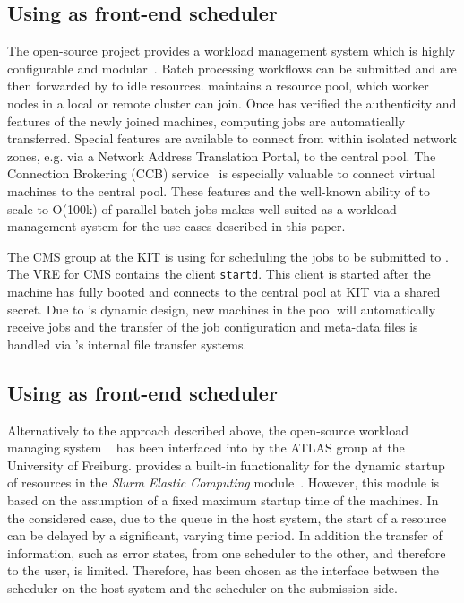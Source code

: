\subsection{Using \HTCondor as front-end scheduler}\label{sec:ROCED:HTCondor}
The open-source project \HTCondor provides a workload management system which is highly configurable and modular~\cite{HTCondor}. Batch processing workflows can be submitted and are then forwarded by \HTCondor to idle resources. \HTCondor maintains a resource pool, which worker nodes in a local or remote cluster can join. Once \HTCondor has verified the authenticity and features of the newly joined machines, computing jobs are automatically transferred. Special features are available to connect from within isolated network zones, e.g. via a Network Address Translation Portal, to the central \HTCondor pool. The Connection Brokering (CCB) service~\cite{HTCondorCCB} is especially valuable to connect virtual machines to the central pool. These features and the well-known ability of \HTCondor to scale to O(100k) of parallel batch jobs makes \HTCondor well suited as a workload management system for the use cases described in this paper.

The CMS group at the KIT is using \HTCondor for scheduling the jobs to be submitted to \NEMO. The VRE for CMS contains the \HTCondor client \texttt{startd}.
This client is started after the machine has fully booted and connects to the central \HTCondor pool at KIT via a shared secret. Due to \HTCondor's dynamic design, new machines in the pool will automatically receive jobs and the transfer of the job configuration and meta-data files is handled via \HTCondor's internal file transfer systems.


\subsection{Using \Slurm as front-end scheduler}

Alternatively to the approach described above, the
open-source workload managing system \Slurm~\cite{Slurm} has been interfaced into \Roced by
the ATLAS group at the University of Freiburg.
\Slurm provides a built-in functionality for the dynamic
startup of resources in the \textit{Slurm Elastic Computing}
module~\cite{SlurmElastic}.
However, this module is based on the assumption of a fixed maximum
startup time of the machines.
In the considered case, due to the queue in the host system, the start of a
resource can be delayed by a significant, varying time period.
In addition the transfer of information, such as error states, from one scheduler to the
other, and therefore to the user, is  limited.
Therefore, \Roced has been chosen as the interface between the
\Moab scheduler on the host system and the \Slurm
scheduler on the submission side.


